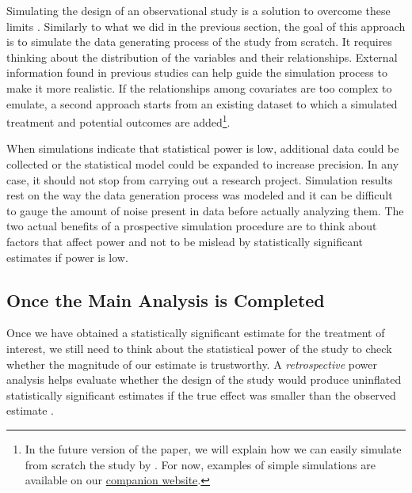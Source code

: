 \documentclass[12pt]{article}
\begin{document}
    
    Simulating the design of an observational study is a solution to overcome these limits \citep{hill_bayesian_2011, gelman_regression_2020, black_simulated_2021}. Similarly to what we did in the previous section, the goal of this approach is to simulate the data generating process of the study from scratch. It requires thinking about the distribution of the variables and their relationships. External information found in previous studies can help guide the simulation process to make it more realistic. If the relationships among covariates are too complex to emulate, a second approach starts from an existing dataset to which a simulated treatment and potential outcomes are added\footnote{In the future version of the paper, we will explain how we can easily simulate from scratch the study by \cite{card_using_1993}. For now, examples of simple simulations are available on our \href{https://vincentbagilet.github.io/causal_inflation/}{companion website}.}.

    When simulations indicate that statistical power is low, additional data could be collected or the statistical model could be expanded to increase precision. In any case, it should not stop from carrying out a research project. Simulation results rest on the way the data generation process was modeled and it can be difficult to gauge the amount of noise present in data before actually analyzing them. The two actual benefits of a prospective simulation procedure are to think about factors that affect power and not to be mislead by statistically significant estimates if power is low. 

\subsection{Once the Main Analysis is Completed}

    Once we have obtained a statistically significant estimate for the treatment of interest, we still need to think about the statistical power of the study to check whether the magnitude of our estimate is trustworthy. A \textit{retrospective} power analysis helps evaluate whether the design of the study would  produce uninflated statistically significant estimates if the true effect was smaller than the observed estimate \citep{gelman_beyond_2014, ioannidis_power_2017, stommes_reliability_2021}.
    
\end{document}
